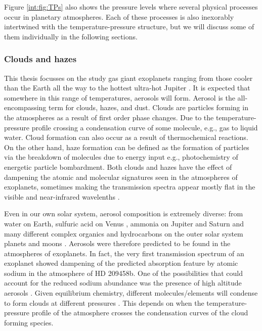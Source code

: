 Figure \ref{int:fig:TPs} also shows the pressure levels where several physical processes occur in planetary atmospheres. Each of these processes is also inexorably intertwined with the temperature-pressure structure, but we will discuss some of them individually in the following sections.

\subsubsection{Clouds and hazes}

This thesis focusses on the study gas giant exoplanets ranging from those cooler than the Earth \citep[Kepler-16b, 200K;][]{Doyle2011} all the way to the hottest ultra-hot Jupiter \citep[KELT-9b, 4000K;][]{Gaudi2017}. It is expected that somewhere in this range of temperatures, aerosols will form. Aerosol is the all-encompassing term for clouds, hazes, and dust. Clouds are particles forming in the atmospheres as a result of first order phase changes. Due to the temperature-pressure profile crossing a condensation curve of some molecule, e.g., gas to liquid water. Cloud formation can also occur as a result of thermochemical reactions. On the other hand, haze formation can be defined as the formation of particles via the breakdown of molecules due to energy input e.g., photochemistry of energetic particle bombardment. Both clouds and hazes have the effect of dampening the atomic and molecular signatures seen in the atmospheres of exoplanets, sometimes making the transmission spectra appear mostly flat in the visible and near-infrared wavelenths \citep[e.g.,][]{Charbonneau2002, Fortney2003, Pont2008}.

Even in our own solar system, aerosol composition is extremely diverse: from water on Earth, sulfuric acid on Venus \citep{Hansen1974}, ammonia on Jupiter and Saturn \citep{Brooke1998, Baines2009} and many different complex organics and hydrocarbons on the outer solar system planets and moons \citep[e.g.,][]{Sromovsky2011, Romani1988, Sagan1992, Brown2002, Rages1992}. Aerosols were therefore predicted to be found in the atmospheres of exoplanets. In fact, the very first transmission spectrum of an exoplanet showed dampening of the predicted absorption feature by atomic sodium in the atmosphere of HD 209458b. One of the possibilities that could account for the reduced sodium abundance was the presence of high altitude aerosols \citep{Charbonneau2002}. Given equilibrium chemistry, different molecules/elements will condense to form clouds at different pressures \citep{Lodders2004, Marley2013}. This depends on when the temperature-pressure profile of the atmosphere crosses the condensation curves of the cloud forming species.

